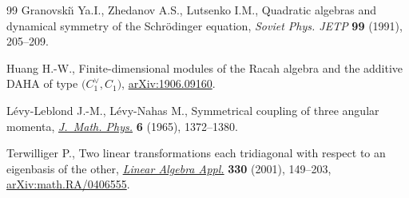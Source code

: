 \documentclass[11pt]{article}
\numberwithin{equation}{section}
\numberwithin{equation}{section}
\begin{document}
\begin{thebibliography}{99}
Granovski\u{\i} Ya.I., Zhedanov A.S., Lutsenko I.M., Quadratic algebras and
 dynamical symmetry of the {S}chr\"{o}dinger equation, \textit{Soviet Phys.
 JETP} \textbf{99} (1991), 205--209.

Huang H.-W., Finite-dimensional modules of the {R}acah algebra and the additive
 {DAHA} of type $\big(C_1^\vee,C_1\big)$, \href{https://arxiv.org/abs/1906.09160}{arXiv:1906.09160}.

L\'{e}vy-Leblond J.-M., L\'{e}vy-Nahas M., Symmetrical coupling of three angular
 momenta, \href{https://doi.org/10.1063/1.1704786}{\textit{J.~Math. Phys.}} \textbf{6} (1965), 1372--1380.

Terwilliger P., Two linear transformations each tridiagonal with respect to an
 eigenbasis of the other, \href{https://doi.org/10.1016/S0024-3795(01)00242-7}{\textit{Linear Algebra Appl.}} \textbf{330} (2001), 149--203, \href{https://arxiv.org/abs/math.RA/0406555}{arXiv:math.RA/0406555}.

\end{thebibliography}
\end{document}
